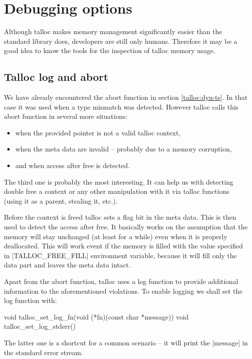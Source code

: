 \section{Debugging options}
\label{talloc:sec:debugging}

Although talloc makes memory management significantly easier than the standard
library does, developers are still only humans. Therefore it may be a good idea
to know the tools for the inspection of talloc memory usage.

\subsection{Talloc log and abort}

We have already encountered the abort function in section \ref{talloc:dyn-ts}.
In that case it was used when a type mismatch was detected. However talloc
calls this abort function in several more situations:

\begin{itemize}
  \item when the provided pointer is not a valid talloc context,
  \item when the meta data are invalid -- probably due to a memory corruption,
  \item and when access after free is detected.
\end{itemize}

The third one is probably the most interesting. It can help us with detecting
double free a context or any other manipulation with it via talloc functions
(using it as a parent, stealing it, etc.).

Before the context is freed talloc sets a flag bit in the meta data. This is
then used to detect the access after free. It basically works on the assumption
that the memory will stay unchanged (at least for a while) even when it is
properly deallocated. This will work event if the memory is filled with the
value specified in |TALLOC_FREE_FILL| environment variable, because it will
fill only the data part and leaves the meta data intact.

Apart from the abort function, talloc uses a log function to provide additional
information to the aforementioned violations. To enable logging we shall set the
log function with:

\begin{funcproto}
void talloc_set_log_fn(void (*fn)(const char *message))
void talloc_set_log_stderr()
\end{funcproto}
\funclistend
The latter one is a shortcut for a common scenario -- it will print the
|message| in the standard error stream.

